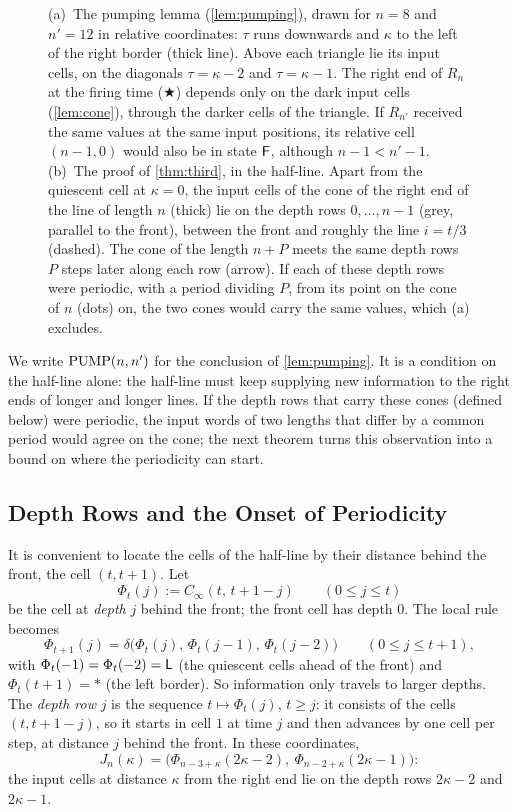 \begin{figure}[t]
\centering

\caption{(a)~The pumping lemma (\cref{lem:pumping}), drawn for $n=8$ and
$n'=12$ in relative coordinates: $\tau$ runs downwards and $\kappa$ to the left
of the right border (thick line). Above each triangle lie its input cells, on
the diagonals $\tau=\kappa-2$ and $\tau=\kappa-1$. The right end of $R_n$ at the
firing time ($\bigstar$) depends only on the dark input cells
(\cref{lem:cone}), through the darker cells of the triangle. If $R_{n'}$
received the same values at the same input positions, its relative cell
$(n-1,0)$ would also be in state $\mathsf F$, although $n-1<n'-1$. (b)~The proof of
\cref{thm:third}, in the half-line. Apart from the quiescent cell at $\kappa=0$,
the input cells of the cone of the right end of the line of length $n$ (thick)
lie on the depth rows $0,\dots,n-1$
(grey, parallel to the front), between the front and roughly the line $i=t/3$
(dashed). The cone of the length $n+P$ meets the same depth rows $P$ steps
later along each row (arrow). If each of these depth rows were periodic, with a
period dividing $P$, from its point on the cone of $n$ (dots) on, the two cones
would carry the same values, which (a) excludes.}
\label{fig:pumping}
\end{figure}

We write $\mathrm{PUMP}(n,n')$ for the conclusion of \cref{lem:pumping}. It is a
condition on the half-line alone: the half-line must keep supplying new
information to the right ends of longer and longer lines. If the depth rows
that carry these cones (defined below) were periodic, the input words of two
lengths that differ by a common period would agree on the cone; the next
theorem turns this observation into a bound on where the periodicity can start.

\subsection{Depth Rows and the Onset of Periodicity}

It is convenient to locate the cells of the half-line by their distance behind
the front, the cell $(t,t+1)$. Let
\[
\Phi_t(j):=C_\infty(t,\,t+1-j)\qquad(0\le j\le t)
\]
be the cell at \emph{depth} $j$ behind the front; the front cell has depth $0$.
The local rule becomes
\begin{equation}\label{eq:comoving}
\Phi_{t+1}(j)=\delta\bigl(\Phi_t(j),\,\Phi_t(j-1),\,\Phi_t(j-2)\bigr)
\qquad(0\le j\le t+1),
\end{equation}
with $\Phi_t(-1)=\Phi_t(-2)=\mathsf L$ (the quiescent cells ahead of the front) and
$\Phi_t(t+1)=\ast$ (the left border). So information only travels to larger
depths. The \emph{depth row} $j$ is the sequence $t\mapsto\Phi_t(j)$, $t\ge j$:
it consists of the cells $(t,t+1-j)$, so it starts in cell $1$ at time $j$ and
then advances by one cell per step, at distance $j$ behind the front. In these
coordinates,
\[
J_n(\kappa)=\bigl(\Phi_{n-3+\kappa}(2\kappa-2),\ \Phi_{n-2+\kappa}(2\kappa-1)\bigr):
\]
the input cells at distance $\kappa$ from the right end lie on the depth rows
$2\kappa-2$ and $2\kappa-1$.


